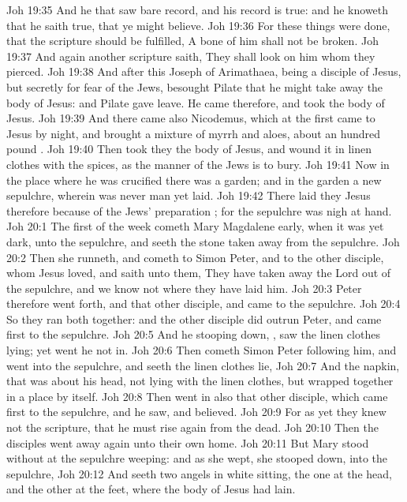 \vs Joh 19:35 And he that saw  bare record, and his record is true: and he knoweth that he saith true, that ye might believe.
\vs Joh 19:36 For these things were done, that the scripture should be fulfilled, A bone of him shall not be broken.
\vs Joh 19:37 And again another scripture saith, They shall look on him whom they pierced.
\vs Joh 19:38 And after this Joseph of Arimathaea, being a disciple of Jesus, but secretly for fear of the Jews, besought Pilate that he might take away the body of Jesus: and Pilate gave  leave. He came therefore, and took the body of Jesus.
\vs Joh 19:39 And there came also Nicodemus, which at the first came to Jesus by night, and brought a mixture of myrrh and aloes, about an hundred pound .
\vs Joh 19:40 Then took they the body of Jesus, and wound it in linen clothes with the spices, as the manner of the Jews is to bury.
\vs Joh 19:41 Now in the place where he was crucified there was a garden; and in the garden a new sepulchre, wherein was never man yet laid.
\vs Joh 19:42 There laid they Jesus therefore because of the Jews' preparation ; for the sepulchre was nigh at hand.
\vs Joh 20:1 The first  of the week cometh Mary Magdalene early, when it was yet dark, unto the sepulchre, and seeth the stone taken away from the sepulchre.
\vs Joh 20:2 Then she runneth, and cometh to Simon Peter, and to the other disciple, whom Jesus loved, and saith unto them, They have taken away the Lord out of the sepulchre, and we know not where they have laid him.
\vs Joh 20:3 Peter therefore went forth, and that other disciple, and came to the sepulchre.
\vs Joh 20:4 So they ran both together: and the other disciple did outrun Peter, and came first to the sepulchre.
\vs Joh 20:5 And he stooping down, , saw the linen clothes lying; yet went he not in.
\vs Joh 20:6 Then cometh Simon Peter following him, and went into the sepulchre, and seeth the linen clothes lie,
\vs Joh 20:7 And the napkin, that was about his head, not lying with the linen clothes, but wrapped together in a place by itself.
\vs Joh 20:8 Then went in also that other disciple, which came first to the sepulchre, and he saw, and believed.
\vs Joh 20:9 For as yet they knew not the scripture, that he must rise again from the dead.
\vs Joh 20:10 Then the disciples went away again unto their own home.
\vs Joh 20:11 But Mary stood without at the sepulchre weeping: and as she wept, she stooped down,  into the sepulchre,
\vs Joh 20:12 And seeth two angels in white sitting, the one at the head, and the other at the feet, where the body of Jesus had lain.
